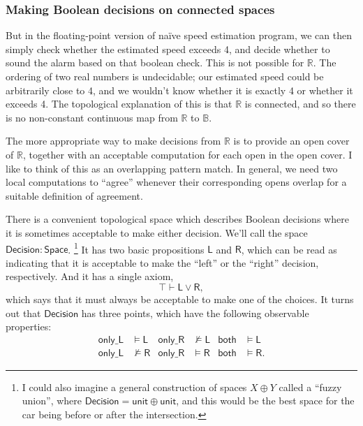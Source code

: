\documentclass{article}           %
\newcommand{\R}{\mathbb{R}}
\newcommand{\bool}{\mathbb{B}}
\newcommand{\Space}{\mathsf{Space}}
\begin{document}
\subsubsection{Making Boolean decisions on connected spaces}
But in the floating-point version of naïve speed estimation program, we can then simply check whether the estimated speed exceeds 4, and decide whether to sound the alarm based on that boolean check. This is not possible for $\R$. The ordering of two real numbers is undecidable; our estimated speed could be arbitrarily close to 4, and we wouldn't know whether it is exactly 4 or whether it exceeds 4. The topological explanation of this is that $\R$ is connected, and so there is no non-constant continuous map from $\R$ to $\bool$.

The more appropriate way to make decisions from $\R$ is to provide an open cover of $\R$, together with an acceptable computation for each open in the open cover. I like to think of this as an overlapping pattern match. In general, we need two local computations to ``agree'' whenever their corresponding opens overlap for a suitable definition of agreement.

There is a convenient topological space which describes Boolean decisions where it is sometimes acceptable to make either decision. We'll call the space $\mathsf{Decision} : \Space$.
\footnote{I could also imagine a general construction of spaces $X \oplus Y$ called a ``fuzzy union'', where $\mathsf{Decision} = \mathsf{unit} \oplus \mathsf{unit}$, and this would be the best space for the car being before or after the intersection.}
 It has two basic propositions $\mathsf{L}$ and $\mathsf{R}$, which can be read as indicating that it is acceptable to make the ``left'' or the ``right'' decision, respectively. And it has a single axiom,
\[
\top \vdash \mathsf{L} \vee \mathsf{R},
\]
which says that it must always be acceptable to make one of the choices. It turns out that $\mathsf{Decision}$ has three points, which have the following observable properties:
\begin{align*}
\mathsf{only\_L} &\models \mathsf{L}
& \mathsf{only\_R} & \nvDash \mathsf{L}
& \mathsf{both} &\models \mathsf{L}
\\
\mathsf{only\_L} &\nvDash \mathsf{R}
& \mathsf{only\_R} & \models \mathsf{R}
& \mathsf{both} &\models \mathsf{R}.
\end{align*}
\end{document}
